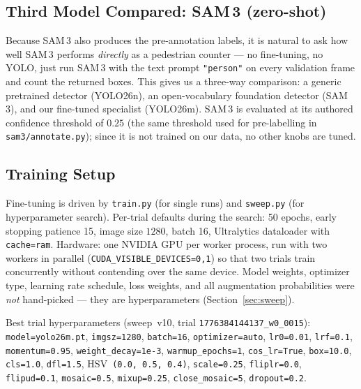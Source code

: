 \documentclass{article}
\begin{document}
\subsection{Third Model Compared: SAM\,3 (zero-shot)}
Because SAM\,3 also produces the pre-annotation labels, it is
natural to ask how well SAM\,3 performs \emph{directly} as a
pedestrian counter --- no fine-tuning, no YOLO, just run SAM\,3
with the text prompt \texttt{"person"} on every validation frame
and count the returned boxes. This gives us a three-way
comparison: a generic pretrained detector (YOLO26n), an
open-vocabulary foundation detector (SAM\,3), and our fine-tuned
specialist (YOLO26m). SAM\,3 is evaluated at its authored
confidence threshold of $0.25$ (the same threshold used for
pre-labelling in \texttt{sam3/annotate.py}); since it is not
trained on our data, no other knobs are tuned.

\subsection{Training Setup}
Fine-tuning is driven by \texttt{train.py} (for single runs) and
\texttt{sweep.py} (for hyperparameter search). Per-trial defaults
during the search: 50 epochs, early stopping patience 15, image
size $1280$, batch 16, Ultralytics dataloader with
\texttt{cache=ram}. Hardware: one NVIDIA GPU per worker process,
run with two workers in parallel
(\texttt{CUDA\_VISIBLE\_DEVICES=0,1}) so that two trials train
concurrently without contending over the same device. Model
weights, optimizer type, learning rate schedule, loss weights,
and all augmentation probabilities were \emph{not} hand-picked ---
they are hyperparameters (Section~\ref{sec:sweep}).

Best trial hyperparameters (sweep~v10, trial
\texttt{1776384144137\_w0\_0015}):
\texttt{model=yolo26m.pt},
\texttt{imgsz=1280}, \texttt{batch=16}, \texttt{optimizer=auto},
\texttt{lr0=0.01}, \texttt{lrf=0.1}, \texttt{momentum=0.95},
\texttt{weight\_decay=1e-3}, \texttt{warmup\_epochs=1},
\texttt{cos\_lr=True}, \texttt{box=10.0}, \texttt{cls=1.0},
\texttt{dfl=1.5}, HSV~\texttt{(0.0, 0.5, 0.4)},
\texttt{scale=0.25}, \texttt{fliplr=0.0}, \texttt{flipud=0.1},
\texttt{mosaic=0.5}, \texttt{mixup=0.25},
\texttt{close\_mosaic=5}, \texttt{dropout=0.2}.
\end{document}
